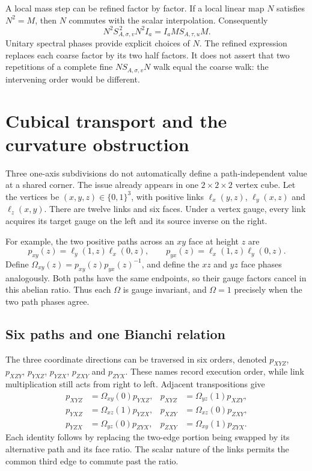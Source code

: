 A local mass step can be refined factor by factor. If a local linear map $N$ satisfies $N^2=M$, then $N$ commutes with the scalar interpolation. Consequently
\[
 N^2S_{A,\sigma,v}^{\,2}N^2I_a
   =I_aMS_{A,\tau,u}M.
\]
Unitary spectral phases provide explicit choices of $N$. The refined expression replaces each coarse factor by its two half factors. It does not assert that two repetitions of a complete fine $N S_{A,\sigma,v}N$ walk equal the coarse walk: the intervening order would be different.




\section{Cubical transport and the curvature obstruction}
\label{g:cube}
Three one-axis subdivisions do not automatically define a path-independent value at a shared corner. The issue already appears in one $2\times2\times2$ vertex cube. Let the vertices be $(x,y,z)\in\{0,1\}^3$, with positive links $\ell_x(y,z)$, $\ell_y(x,z)$ and $\ell_z(x,y)$. There are twelve links and six faces. Under a vertex gauge, every link acquires its target gauge on the left and its source inverse on the right.

For example, the two positive paths across an $xy$ face at height $z$ are
\[
 p_{xy}(z)=\ell_y(1,z)\ell_x(0,z),\qquad
 p_{yx}(z)=\ell_x(1,z)\ell_y(0,z).
\]
Define $\Omega_{xy}(z)=p_{xy}(z)p_{yx}(z)^{-1}$, and define the $xz$ and $yz$ face phases analogously. Both paths have the same endpoints, so their gauge factors cancel in this abelian ratio. Thus each $\Omega$ is gauge invariant, and $\Omega=1$ precisely when the two path phases agree.

\subsection{Six paths and one Bianchi relation}
The three coordinate directions can be traversed in six orders, denoted $p_{XYZ}$, $p_{XZY}$, $p_{YXZ}$, $p_{YZX}$, $p_{ZXY}$ and $p_{ZYX}$. These names record execution order, while link multiplication still acts from right to left. Adjacent transpositions give
\begin{align*}
 p_{XYZ}&=\Omega_{xy}(0)p_{YXZ},&
 p_{XYZ}&=\Omega_{yz}(1)p_{XZY},\\
 p_{YXZ}&=\Omega_{xz}(1)p_{YZX},&
 p_{XZY}&=\Omega_{xz}(0)p_{ZXY},\\
 p_{YZX}&=\Omega_{yz}(0)p_{ZYX},&
 p_{ZXY}&=\Omega_{xy}(1)p_{ZYX}.
\end{align*}
Each identity follows by replacing the two-edge portion being swapped by its alternative path and its face ratio. The scalar nature of the links permits the common third edge to commute past the ratio.

